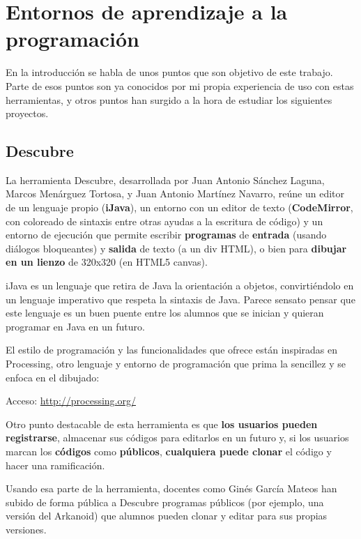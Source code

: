 \documentclass{report}
\begin{document}
	\vspace{10px}
	
	\section{Entornos de aprendizaje a la programación}
	
	En la introducción se habla de unos puntos que son objetivo de este trabajo. Parte de esos puntos son ya conocidos por mi propia experiencia de uso con estas herramientas, y otros puntos han surgido a la hora de estudiar los siguientes proyectos.
	
	\subsection{Descubre}
	
	\label{descubre}
	
	La herramienta Descubre, desarrollada por Juan Antonio Sánchez Laguna, Marcos Menárguez Tortosa, y Juan Antonio Martínez Navarro, reúne un editor de un lenguaje propio (\textbf{iJava}), un entorno con un editor de texto (\textbf{CodeMirror}, con coloreado de sintaxis entre otras ayudas a la escritura de código) y un entorno de ejecución que permite escribir \textbf{programas} de \textbf{entrada} (usando diálogos bloqueantes) y \textbf{salida} de texto (a un div HTML), o bien para \textbf{dibujar en un lienzo} de 320x320 (en HTML5 canvas).
	
	
	iJava es un lenguaje que retira de Java la orientación a objetos, convirtiéndolo en un lenguaje imperativo que respeta la sintaxis de Java. Parece sensato pensar que este lenguaje es un buen puente entre los alumnos que se inician y quieran programar en Java en un futuro.
	
	El estilo de programación y las funcionalidades que ofrece están inspiradas en Processing, otro lenguaje y entorno de programación que prima la sencillez y se enfoca en el dibujado:
	
	Acceso: \href{http://processing.org/}{http://processing.org/}
	
	Otro punto destacable de esta herramienta es que \textbf{los usuarios pueden registrarse}, almacenar sus códigos para editarlos en un futuro y, si los usuarios marcan los \textbf{códigos} como \textbf{públicos}, \textbf{cualquiera puede clonar} el código y hacer una ramificación. 
	
	Usando esa parte de la herramienta, docentes como Ginés García Mateos han subido de forma pública a Descubre programas públicos (por ejemplo, una versión del Arkanoid) que alumnos pueden clonar y editar para sus propias versiones.
	
\end{document}

